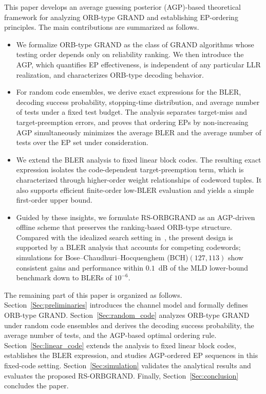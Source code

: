 \documentclass[letterpaper,draftclsnofoot,onecolumn]{IEEEtran}
\begin{document}

This paper develops an average guessing posterior (AGP)-based theoretical framework for analyzing ORB-type GRAND and establishing EP-ordering principles. The main contributions are summarized as follows.

\begin{itemize}
    \item We formalize ORB-type GRAND as the class of GRAND algorithms whose testing order depends only on reliability ranking. We then introduce the AGP, which quantifies EP effectiveness, is independent of any particular LLR realization, and characterizes ORB-type decoding behavior.
    \item For random code ensembles, we derive exact expressions for the BLER, decoding success probability, stopping-time distribution, and average number of tests under a fixed test budget. The analysis separates target-miss and target-preemption errors, and proves that ordering EPs by non-increasing AGP simultaneously minimizes the average BLER and the average number of tests over the EP set under consideration.
    \item We extend the BLER analysis to fixed linear block codes. The resulting exact expression isolates the code-dependent target-preemption term, which is characterized through higher-order weight relationships of codeword tuples. It also supports efficient finite-order low-BLER evaluation and yields a simple first-order upper bound.
    \item Guided by these insights, we formulate RS-ORBGRAND as an AGP-driven offline scheme that preserves the ranking-based ORB-type structure. Compared with the idealized search setting in~\cite{wan2024approaching}, the present design is supported by a BLER analysis that accounts for competing codewords; simulations for Bose--Chaudhuri--Hocquenghem (BCH)$(127,113)$ show consistent gains and performance within $0.1$~dB of the MLD lower-bound benchmark down to BLERs of $10^{-6}$.
\end{itemize}

The remaining part of this paper is organized as follows. 
Section~\ref{Sec:preliminaries} introduces the channel model and formally defines ORB-type GRAND. 
Section~\ref{Sec:random_code} analyzes ORB-type GRAND under random code ensembles and derives the decoding success probability, the average number of tests, and the AGP-based optimal ordering rule. 
Section~\ref{Sec:linear_code} extends the analysis to fixed linear block codes, establishes the BLER expression, and studies AGP-ordered EP sequences in this fixed-code setting. 
Section~\ref{Sec:simulation} validates the analytical results and evaluates the proposed RS-ORBGRAND. 
Finally, Section~\ref{Sec:conclusion} concludes the paper.
\end{document}
